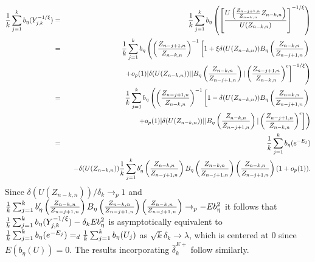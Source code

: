 \documentclass[twoside,leqno,11pt]{article}
\begin{document}
\begin{eqnarray*}
{1 \over k}\sum_{j=1}^k b_\eta (Y_{j,k}^{-1/\xi}) &=&
{1 \over k}\sum_{j=1}^k b_\eta \left(\left[ {U \left({Z_{n-j+1,n}\over Z_{n-k,n}} Z_{n-k,n} \right)\over U(Z_{n-k,n}) }\right]^{-1/\xi} \right)\\
&=& {1 \over k}\sum_{j=1}^k b_\eta
\left(
\left({Z_{n-j+1,n}\over Z_{n-k,n}}\right)^{-1}
\left[
1+\xi \delta (U(Z_{n-k,n}))B_\eta \left( {Z_{n-k,n} \over Z_{n-j+1,n}}\right) \right. \right. \\
&& \hspace{2.5cm}\left.\left.
+o_p(1)|\delta (U(Z_{n-k,n}))| |B_\eta \left( {Z_{n-k,n} \over Z_{n-j+1,n}}\right)| \left({Z_{n-j+1,n}\over Z_{n-k,n}}\right)^\epsilon 
\right]^{-1/\xi}
\right)\\
&=&{1 \over k}\sum_{j=1}^k b_\eta
\left(
\left({Z_{n-j+1,n}\over Z_{n-k,n}}\right)^{-1}
\left[
1-\delta (U(Z_{n-k,n}))B_\eta \left( {Z_{n-k,n} \over Z_{n-j+1,n}}\right) \right. \right. \\
&& \hspace{2.5cm}\left.\left.
+o_p(1)|\delta (U(Z_{n-k,n}))| |B_\eta \left( {Z_{n-k,n} \over Z_{n-j+1,n}}\right)| \left({Z_{n-j+1,n}\over Z_{n-k,n}}\right)^\epsilon 
\right]
\right)
\\
&=& {1 \over k}\sum_{j=1}^k b_\eta (e^{-E_j})\\
&& \hspace{0.3cm}
-\delta (U(Z_{n-k,n})){1 \over k}\sum_{j=1}^k 
b'_\eta \left( {Z_{n-k,n} \over Z_{n-j+1,n}}\right)
B_\eta \left( {Z_{n-k,n} \over Z_{n-j+1,n}}\right) \left( {Z_{n-k,n} \over Z_{n-j+1,n}}\right)(1+o_p(1)).
\end{eqnarray*}
Since $\delta (U(Z_{n-k,n}))/\delta_k \to_p 1$
and ${1 \over k}\sum_{j=1}^k 
b'_\eta \left( {Z_{n-k,n} \over Z_{n-j+1,n}}\right)
B_\eta \left( {Z_{n-k,n} \over Z_{n-j+1,n}}\right) \left( {Z_{n-k,n} \over Z_{n-j+1,n}}\right) \to_p - Eb^2_\eta$
it follows that 
$
{1 \over k}\sum_{j=1}^k b_\eta (Y_{j,k}^{-1/\xi})
- \delta_k E b^2_{\eta}$
is asymptotically equivalent to ${1 \over k}\sum_{j=1}^k b_\eta (e^{-E_j})=_d {1 \over k}\sum_{j=1}^k b_\eta (U_j)$ as $\sqrt{k} \delta_k \to \lambda$, which is centered at 0 since $E(b_\eta (U))=0$.
The results incorporating $\hat{\delta}_k^{E+}$ follow similarly.
\end{document}
